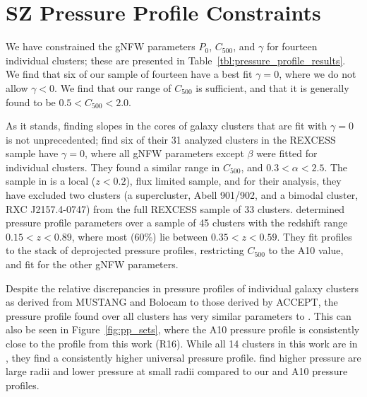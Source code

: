 \documentclass[iop,numberedappendix,apj]{emulateapj}
\begin{document}
\section{SZ Pressure Profile Constraints}
\label{sec:pp_constraints}

We have constrained the gNFW parameters $P_0$, $C_{500}$, and $\gamma$ for fourteen individual clusters;
these are presented in Table~\ref{tbl:pressure_profile_results}. 
We find that six of our sample of fourteen have a best fit $\gamma = 0$, where we do not allow $\gamma <0$. 
We find that our range of $C_{500}$ is sufficient, and that it is generally found to be $0.5 < C_{500} < 2.0$. 

As it stands, finding slopes in the cores of galaxy clusters that are fit with $\gamma = 0$ is not unprecedented; 
\citet{arnaud2010} find six of their 31 analyzed clusters in the REXCESS sample 
have $\gamma=0$, where all gNFW parameters except $\beta$ were fitted for individual clusters. They found a 
similar range in $C_{500}$, and $0.3 < \alpha < 2.5$. The sample in \citet{arnaud2010} is a local ($z < 0.2$), 
flux limited sample, and for their analysis, they have excluded two clusters (a supercluster, Abell 901/902, 
and a bimodal cluster, RXC J2157.4-0747) from the full REXCESS sample of 33 clusters. \citet{sayers2013} 
determined pressure profile parameters over a sample of 45 clusters with the redshift range $0.15 < z < 0.89$, 
where most (60\%) lie between $0.35 < z < 0.59$. They fit profiles to the stack of deprojected pressure 
profiles, restricting $C_{500}$ to the A10 value, and fit for the other gNFW parameters. 

Despite the relative discrepancies in pressure profiles of individual galaxy clusters as derived from MUSTANG and
Bolocam to those derived by ACCEPT, the pressure profile found over all clusters 
has very similar parameters to \citet{arnaud2010}. This can also be seen in Figure~\ref{fig:pp_sets},
where the A10 pressure profile is consistently close to the profile from this work (R16). While all 14 clusters
in this work are in \citet{sayers2013}, they find a consistently higher universal pressure profile.
\citet{planck2013a} find higher pressure are large radii and lower pressure at small radii compared to our
and A10 pressure profiles. 
\end{document}
